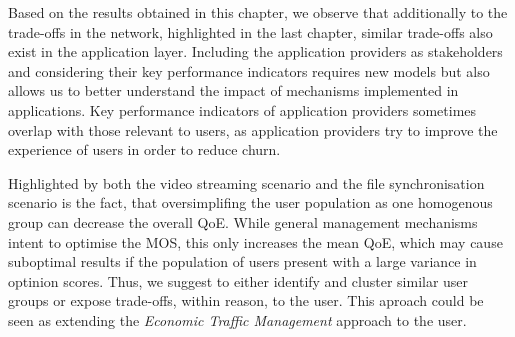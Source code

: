 Based on the results obtained in this chapter, we observe that additionally to the trade-offs in the network, highlighted in the last chapter, similar trade-offs also exist in the application layer.
Including the application providers as stakeholders and considering their key performance indicators requires new models but also allows us to better understand the impact of mechanisms implemented in applications.
Key performance indicators of application providers sometimes overlap with those relevant to users, as application providers try to improve the experience of users in order to reduce churn.

Highlighted by both the video streaming scenario and the file synchronisation scenario is the fact, that oversimplifing the user population as one homogenous group can decrease the overall \gls{QoE}.
While general  management mechanisms intent to optimise the \gls{MOS}, this only increases the mean \gls{QoE}, which may cause suboptimal results if the population of users present with a large variance in optinion scores.
Thus, we suggest to either identify and cluster similar user groups or expose trade-offs, within reason, to the user.
This aproach could be seen as extending the \emph{Economic Traffic Management} approach to the user.